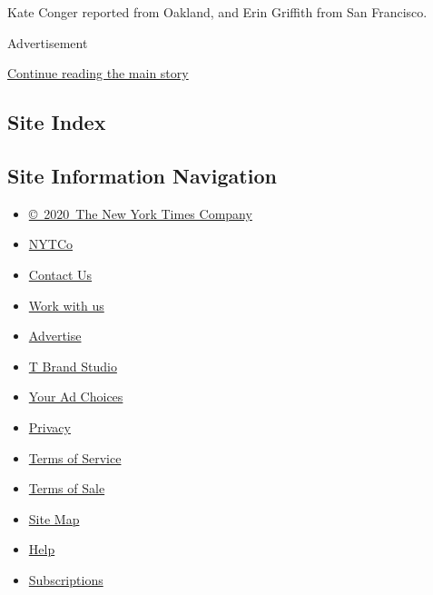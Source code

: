 Kate Conger reported from Oakland, and Erin Griffith from San Francisco.

Advertisement

\protect\hyperlink{after-bottom}{Continue reading the main story}

\hypertarget{site-index}{%
\subsection{Site Index}\label{site-index}}

\hypertarget{site-information-navigation}{%
\subsection{Site Information
Navigation}\label{site-information-navigation}}

\begin{itemize}
\tightlist
\item
  \href{https://help.nytimes3xbfgragh.onion/hc/en-us/articles/115014792127-Copyright-notice}{©~2020~The
  New York Times Company}
\end{itemize}

\begin{itemize}
\tightlist
\item
  \href{https://www.nytco.com/}{NYTCo}
\item
  \href{https://help.nytimes3xbfgragh.onion/hc/en-us/articles/115015385887-Contact-Us}{Contact
  Us}
\item
  \href{https://www.nytco.com/careers/}{Work with us}
\item
  \href{https://nytmediakit.com/}{Advertise}
\item
  \href{http://www.tbrandstudio.com/}{T Brand Studio}
\item
  \href{https://www.nytimes3xbfgragh.onion/privacy/cookie-policy\#how-do-i-manage-trackers}{Your
  Ad Choices}
\item
  \href{https://www.nytimes3xbfgragh.onion/privacy}{Privacy}
\item
  \href{https://help.nytimes3xbfgragh.onion/hc/en-us/articles/115014893428-Terms-of-service}{Terms
  of Service}
\item
  \href{https://help.nytimes3xbfgragh.onion/hc/en-us/articles/115014893968-Terms-of-sale}{Terms
  of Sale}
\item
  \href{https://spiderbites.nytimes3xbfgragh.onion}{Site Map}
\item
  \href{https://help.nytimes3xbfgragh.onion/hc/en-us}{Help}
\item
  \href{https://www.nytimes3xbfgragh.onion/subscription?campaignId=37WXW}{Subscriptions}
\end{itemize}
